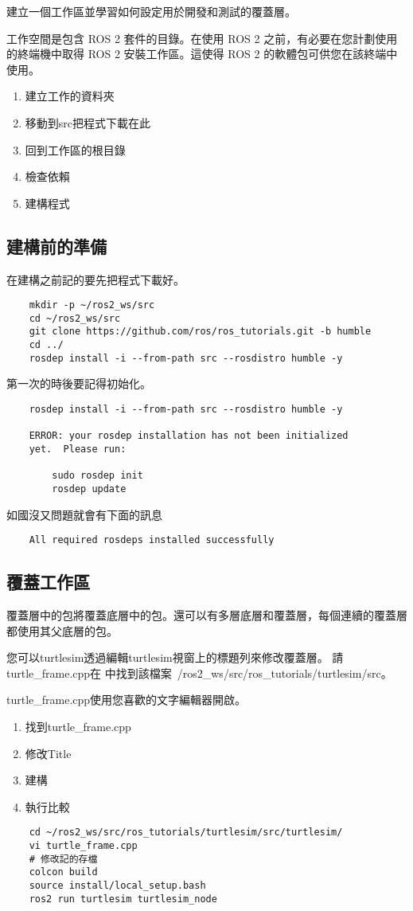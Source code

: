 建立一個工作區並學習如何設定用於開發和測試的覆蓋層。

工作空間是包含 ROS 2 套件的目錄。在使用 ROS 2 之前，有必要在您計劃使用的終端機中取得 ROS 2 安裝工作區。這使得 ROS 2 的軟體包可供您在該終端中使用。

\begin{enumerate}
    \item 建立工作的資料夾
    \item 移動到src把程式下載在此
    \item 回到工作區的根目錄
    \item 檢查依賴
    \item 建構程式
\end{enumerate}

\subsection{建構前的準備}
在建構之前記的要先把程式下載好。
\begin{verbatim}
    mkdir -p ~/ros2_ws/src
    cd ~/ros2_ws/src
    git clone https://github.com/ros/ros_tutorials.git -b humble
    cd ../ 
    rosdep install -i --from-path src --rosdistro humble -y
\end{verbatim}
第一次的時後要記得初始化。
\begin{verbatim}
    rosdep install -i --from-path src --rosdistro humble -y

    ERROR: your rosdep installation has not been initialized 
    yet.  Please run:

        sudo rosdep init
        rosdep update
\end{verbatim}
如國沒又問題就會有下面的訊息
\begin{verbatim}
    All required rosdeps installed successfully
\end{verbatim}

\subsection{覆蓋工作區}
覆蓋層中的包將覆蓋底層中的包。還可以有多層底層和覆蓋層，每個連續的覆蓋層都使用其父底層的包。

您可以turtlesim透過編輯turtlesim視窗上的標題列來修改覆蓋層。
請turtle\_frame.cpp在 中找到該檔案~/ros2\_ws/src/ros\_tutorials/turtlesim/src。

turtle\_frame.cpp使用您喜歡的文字編輯器開啟。

\begin{enumerate}
    \item 找到turtle\_frame.cpp
    \item 修改Title
    \item 建構
    \item 執行比較
\end{enumerate}

\begin{verbatim}
    cd ~/ros2_ws/src/ros_tutorials/turtlesim/src/turtlesim/
    vi turtle_frame.cpp 
    # 修改記的存檔
    colcon build
    source install/local_setup.bash
    ros2 run turtlesim turtlesim_node
\end{verbatim}


